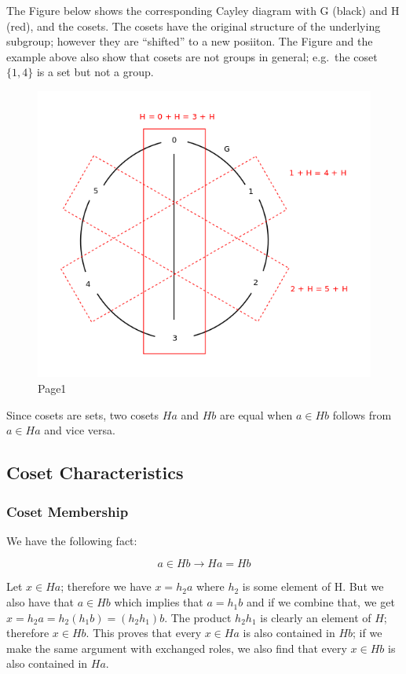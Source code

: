The Figure below shows the corresponding Cayley diagram with G (black)
and H (red), and the cosets. The cosets have the original structure of
the underlying subgroup; however they are ``shifted'' to a new posiiton.
The Figure and the example above also show that cosets are not groups in
general; e.g.~the coset \(\{1,4\}\) is a set but not a group.

\begin{figure}[H]
\centering
\includegraphics[scale=0.7]{images/groups_05_1.png}
\caption{Page1}
\end{figure}

Since cosets are sets, two cosets \(Ha\) and \(Hb\) are equal when
\(a \in H b\) follows from \(a \in H a\) and vice versa.

\subsection{Coset Characteristics}\label{coset-characterisitcs}

\subsubsection{Coset Membership}\label{coset-membership}

We have the following fact:

\[
a \in Hb \rightarrow Ha = Hb
\]

Let \(x \in Ha\); therefore we have \(x = h_2 a\) where \(h_2\) is some
element of H. But we also have that \(a \in Hb\) which implies that
\(a = h_1 b\) and if we combine that, we get
\(x = h_2 a = h_2 ( h_1 b) = (h_2 h_1) b\). The product \(h_2 h_1\) is
clearly an element of \(H\); therefore \(x \in Hb\). This proves that
every \(x \in Ha\) is also contained in \(Hb\); if we make the same
argument with exchanged roles, we also find that every \(x \in Hb\) is
also contained in \(Ha\).

